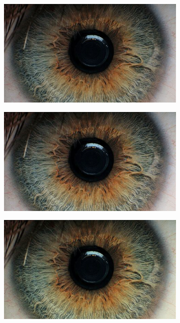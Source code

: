 \documentclass{article}
\begin{document}
\begin{figure}[h]
\centering
\begin{subfigure}{.3\textwidth}
  \centering
  \includegraphics[width=0.97\linewidth]{_Figures/sample_1.jpg}
  \caption{}
  \label{fig:raw_hist_1}
\end{subfigure}%
\begin{subfigure}{.3\textwidth}
  \centering
  \includegraphics[width=0.97\linewidth]{_Figures/sample_1_normalization_average.png}
  \caption{}
  \label{fig:average_hist_1}
\end{subfigure}
\begin{subfigure}{.3\textwidth}
  \centering
  \includegraphics[width=0.97\linewidth]{_Figures/sample_1_normalization_per_channel.png}
  \caption{}
    \label{fig:per_hist_1}
\end{subfigure}%


\end{figure}
\end{document}
